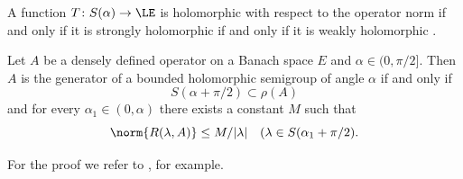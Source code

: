\begin{remark*}\label{rem:a2-1.5-kgk}
A function $T \colon S(\alpha) \to \LE$ is holomorphic with respect to the operator norm if and only if it is strongly holomorphic if and only if it is weakly holomorphic \textcite[V.3]{yosida:1965}.
\end{remark*}

\begin{theorem}\label{thm:a2-1.12}
Let $A$ be a densely defined operator on a Banach space $E$ and $\alpha \in (0,\pi/2]$.
Then $A$ is the generator of a bounded holomorphic semigroup of angle $\alpha$ if and only if 
\[
S(\alpha + \pi/2) \subset \rho(A)
\]
and for every $\alpha_{1} \in (0,\alpha)$ there exists a constant $M$ such that
\begin{equation}\label{eq:a2-1.6}
    \norm{R(\lambda,A)} \leq M/|\lambda| \quad (\lambda \in S(\alpha_{1} + \pi/2). 
\end{equation}
\end{theorem}
For the proof we refer to \textcite{davies:1980}, for example.

